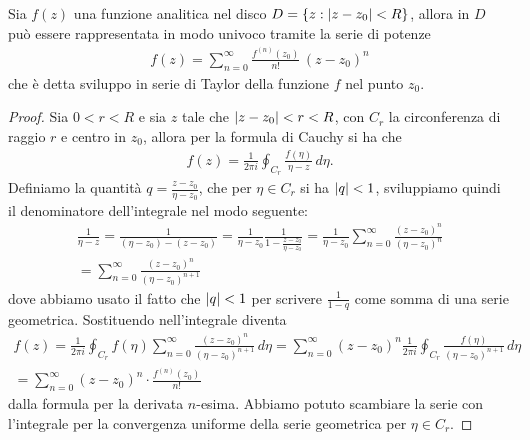 \begin{theorem}[ di Taylor ]
  Sia $ f(z) $ una funzione analitica nel disco $ D = \{ z: \left|{z - z_0}\right| < R\} $, allora in $ D $ può essere rappresentata in modo univoco tramite la 
  serie di potenze 
  \begin{align}
    f(z) = \sum_{n=0}^\infty \frac{f^{(n)}(z_0)}{n!} \,(z - z_0)^n
  \end{align}
  che è detta sviluppo in serie di Taylor della funzione $ f $ nel punto $ z_0 $.
\end{theorem}
\begin{proof}
  Sia $ 0 < r < R $ e sia $ z $ tale che $ \left|{z - z_0}\right| < r < R $, con $ C_r $ la circonferenza di raggio $ r $ e centro in $ z_0 $, allora per la formula 
  di Cauchy si ha che 
  \begin{align}
    f(z) = \frac1{2\pi i} \oint_{C_r} \frac{f(\eta)}{\eta - z} \,d\eta.
  \end{align}
  Definiamo la quantità $ q = \frac{z - z_0}{\eta - z_0} $, che per $ \eta \in C_r $ si ha $ \left|{q}\right| < 1 $, sviluppiamo quindi il denominatore 
  dell'integrale nel modo seguente:
  \begin{gather}
    \frac1{\eta - z} = \frac1{(\eta - z_0) - (z - z_0)} = \frac1{\eta - z_0} \frac1{1 - \frac{z - z_0}{\eta - z_0}} 
    = \frac1{\eta - z_0} \sum_{n=0}^\infty \frac{(z - z_0)^n}{(\eta - z_0)^n}
    \\
    = \sum_{n=0}^\infty \frac{(z - z_0)^n}{(\eta - z_0)^{n+1}}
  \end{gather}
  dove abbiamo usato il fatto che $ \left|{q}\right| < 1 $ per scrivere $ \frac1{1-q} $ come somma di una serie geometrica. Sostituendo nell'integrale diventa
  \begin{gather}
    f(z) = \frac1{2\pi i} \oint_{C_r} f(\eta) \sum_{n=0}^\infty \frac{(z - z_0)^n}{(\eta - z_0)^{n+1}} \, d\eta 
    = \sum_{n=0}^\infty (z - z_0)^n \frac1{2\pi i} \oint_{C_r} \frac{f(\eta)}{(\eta - z_0)^{n+1}} \,d\eta 
    \\
    = \sum_{n=0}^\infty (z - z_0)^n \cdot \frac{f^{(n)}(z_0)}{n!}
  \end{gather}
  dalla formula per la derivata $ n $-esima. Abbiamo potuto scambiare la serie con l'integrale per la convergenza uniforme della serie geometrica per 
  $ \eta \in C_r $.
\end{proof}


